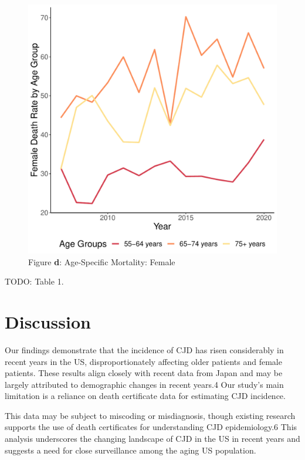 \documentclass[12pt]{article}
\begin{document}
\begin{figure}
    \centering
    \includegraphics[scale=0.5]{analysis/output/female_age_specific_deaths_plot.pdf}
    \caption{Figure \textbf{d}: Age-Specific Mortality: Female}
    \label{fig:female_age_specific_deaths}
\end{figure}

TODO: Table 1.

\section*{Discussion}
 
\par \bigskip
\noindent Our findings demonstrate that the incidence of CJD has risen considerably in recent years in the US, disproportionately affecting older patients and female patients. These results align closely with recent data from Japan and may be largely attributed to demographic changes in recent years.4 Our study’s main limitation is a reliance on death certificate data for estimating CJD incidence.

\par \bigskip
\noindent This data may be subject to miscoding or misdiagnosis, though existing research supports the use of death certificates for understanding CJD epidemiology.6 This analysis underscores the changing landscape of CJD in the US in recent years and suggests a need for close surveillance among the aging US population.  




\end{document}

